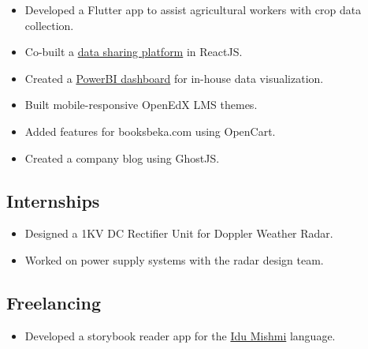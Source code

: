 \documentclass[11pt,a4paper,sans]{moderncv}
\begin{document}
\item {}
{
\begin{itemize}
    \item Developed a Flutter app to assist agricultural workers with crop data collection.
    \item Co-built a \href{https://farmstack.co/}{data sharing platform} in ReactJS.
    \item Created a \href{https://dashboard.digitalgreen.org/}{PowerBI dashboard} for in-house data visualization.
\end{itemize}
}

\item {}
{
\begin{itemize}
    \item Built mobile-responsive OpenEdX LMS themes.
    \item Added features for booksbeka.com using OpenCart.
    \item Created a company blog using GhostJS.
\end{itemize}
}

\subsection{Internships}

\item {}
{
\begin{itemize}
    \item Designed a 1KV DC Rectifier Unit for Doppler Weather Radar.
    \item Worked on power supply systems with the radar design team.
\end{itemize}
}

\subsection{Freelancing}

\item {}
{
\begin{itemize}
    \item Developed a storybook reader app for the \href{https://en.wikipedia.org/wiki/Idu_Mishmi_language}{Idu Mishmi} language.
\end{itemize}
}
\end{document}
